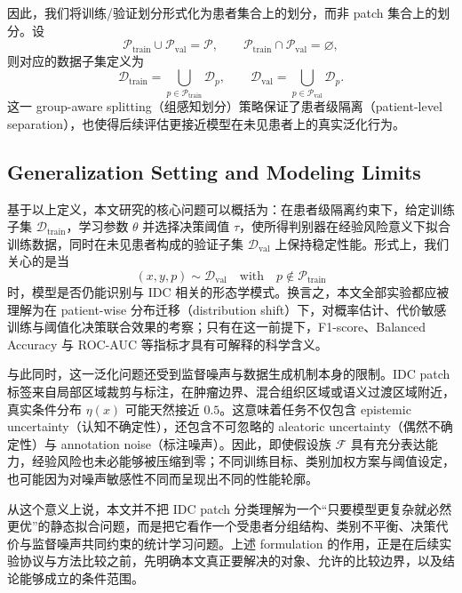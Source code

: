 因此，我们将训练/验证划分形式化为患者集合上的划分，而非 patch 集合上的划分。设
\begin{equation}
    \mathcal{P}_{\mathrm{train}} \cup \mathcal{P}_{\mathrm{val}} = \mathcal{P},
    \qquad
    \mathcal{P}_{\mathrm{train}} \cap \mathcal{P}_{\mathrm{val}} = \varnothing,
\end{equation}
则对应的数据子集定义为
\begin{equation}
    \mathcal{D}_{\mathrm{train}} = \bigcup_{p \in \mathcal{P}_{\mathrm{train}}} \mathcal{D}_{p},
    \qquad
    \mathcal{D}_{\mathrm{val}} = \bigcup_{p \in \mathcal{P}_{\mathrm{val}}} \mathcal{D}_{p}.
\end{equation}
这一 group-aware splitting（组感知划分）策略保证了患者级隔离（patient-level separation），也使得后续评估更接近模型在未见患者上的真实泛化行为。

\subsection{Generalization Setting and Modeling Limits}

基于以上定义，本文研究的核心问题可以概括为：在患者级隔离约束下，给定训练子集 $\mathcal{D}_{\mathrm{train}}$，学习参数 $\theta$ 并选择决策阈值 $\tau$，使所得判别器在经验风险意义下拟合训练数据，同时在未见患者构成的验证子集 $\mathcal{D}_{\mathrm{val}}$ 上保持稳定性能。形式上，我们关心的是当
\begin{equation}
    (x,y,p) \sim \mathcal{D}_{\mathrm{val}}
    \quad \text{with} \quad
    p \notin \mathcal{P}_{\mathrm{train}}
\end{equation}
时，模型是否仍能识别与 IDC 相关的形态学模式。换言之，本文全部实验都应被理解为在 patient-wise 分布迁移（distribution shift）下，对概率估计、代价敏感训练与阈值化决策联合效果的考察；只有在这一前提下，F1-score、Balanced Accuracy 与 ROC-AUC 等指标才具有可解释的科学含义。

与此同时，这一泛化问题还受到监督噪声与数据生成机制本身的限制。IDC patch 标签来自局部区域裁剪与标注，在肿瘤边界、混合组织区域或语义过渡区域附近，真实条件分布 $\eta(x)$ 可能天然接近 $0.5$。这意味着任务不仅包含 epistemic uncertainty（认知不确定性），还包含不可忽略的 aleatoric uncertainty（偶然不确定性）与 annotation noise（标注噪声）。因此，即使假设族 $\mathcal{F}$ 具有充分表达能力，经验风险也未必能够被压缩到零；不同训练目标、类别加权方案与阈值设定，也可能因为对噪声敏感性不同而呈现出不同的性能轮廓。

从这个意义上说，本文并不把 IDC patch 分类理解为一个“只要模型更复杂就必然更优”的静态拟合问题，而是把它看作一个受患者分组结构、类别不平衡、决策代价与监督噪声共同约束的统计学习问题。上述 formulation 的作用，正是在后续实验协议与方法比较之前，先明确本文真正要解决的对象、允许的比较边界，以及结论能够成立的条件范围。

